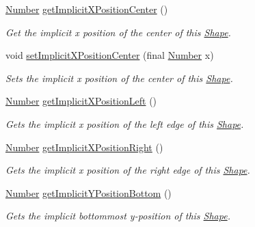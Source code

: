 \begin{DoxyCompactItemize}
\hyperlink{interfacecom_1_1aarrelaakso_1_1drawl_1_1_number}{Number} \hyperlink{classcom_1_1aarrelaakso_1_1drawl_1_1_shape_a9632097be62eb03e09145763852bda85}{get\+Implicit\+X\+Position\+Center} ()
\begin{DoxyCompactList}\small\item\em Get the implicit x position of the center of this \hyperlink{classcom_1_1aarrelaakso_1_1drawl_1_1_shape}{Shape}. \end{DoxyCompactList}\item 
void \hyperlink{classcom_1_1aarrelaakso_1_1drawl_1_1_shape_a945597709a9d79688e48a9802c86b13b}{set\+Implicit\+X\+Position\+Center} (final \hyperlink{interfacecom_1_1aarrelaakso_1_1drawl_1_1_number}{Number} x)
\begin{DoxyCompactList}\small\item\em Sets the implicit x position of the center of this \hyperlink{classcom_1_1aarrelaakso_1_1drawl_1_1_shape}{Shape}. \end{DoxyCompactList}\item 
\hyperlink{interfacecom_1_1aarrelaakso_1_1drawl_1_1_number}{Number} \hyperlink{classcom_1_1aarrelaakso_1_1drawl_1_1_shape_a2f272e8bfa625bb7959d1f722d5ac3df}{get\+Implicit\+X\+Position\+Left} ()
\begin{DoxyCompactList}\small\item\em Gets the implicit x position of the left edge of this \hyperlink{classcom_1_1aarrelaakso_1_1drawl_1_1_shape}{Shape}. \end{DoxyCompactList}\item 
\hyperlink{interfacecom_1_1aarrelaakso_1_1drawl_1_1_number}{Number} \hyperlink{classcom_1_1aarrelaakso_1_1drawl_1_1_shape_a15599ef4ee30a0ddd372f7cf1b155ce1}{get\+Implicit\+X\+Position\+Right} ()
\begin{DoxyCompactList}\small\item\em Gets the implicit x position of the right edge of this \hyperlink{classcom_1_1aarrelaakso_1_1drawl_1_1_shape}{Shape}. \end{DoxyCompactList}\item 
\hyperlink{interfacecom_1_1aarrelaakso_1_1drawl_1_1_number}{Number} \hyperlink{classcom_1_1aarrelaakso_1_1drawl_1_1_shape_a8d44b02976656bf4a81055a2dbae66cb}{get\+Implicit\+Y\+Position\+Bottom} ()
\begin{DoxyCompactList}\small\item\em Gets the implicit bottommost y-\/position of this \hyperlink{classcom_1_1aarrelaakso_1_1drawl_1_1_shape}{Shape}. \end{DoxyCompactList}\item 

\end{DoxyCompactItemize}
